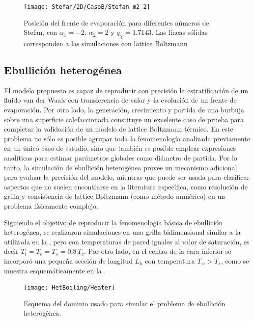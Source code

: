 \begin{figure}[ht]
	\centering
	\texttt{[image: Stefan/2D/CasoB/Stefan\_m2\_2]}
	\caption{Posici\'on del frente de evaporaci\'on para diferentes n\'umeros de Stefan, con $\alpha_1 = -2$, $\alpha_2=2$ y $q_{\chi} = 1.7143$. Las l\'ineas s\'olidas corresponden a las simulaciones con lattice Boltzmann}
	\label{fig:Stefan_m2_2}
\end{figure}










\subsection{Ebullici\'on heterog\'enea}

El modelo propuesto es capaz de reproducir con precisi\'on la estratificaci\'on de un fluido van der Waals con transferencia de calor y la evoluci\'on de un frente de evaporaci\'on. Por otro lado, la generaci\'on, crecimiento y partida de una burbuja sobre  una superficie calefaccionada constituye un excelente caso de prueba para completar la validaci\'on de un modelo de lattice Boltzmann t\'ermico. En este problema no s\'olo es posible agrupar toda la fenomenolog\'ia analizada previamente en un \'unico caso de estudio, sino que tambi\'en es posible emplear expresiones anal\'iticas para estimar par\'ametros globales como di\'ametro de partida. Por lo tanto, la simulaci\'on de ebullici\'on heterog\'enea provee un mecanismo adicional para evaluar la precisi\'on del modelo, mientras que puede ser usada para clarificar aspectos que no suelen encontrarse en la literatura espec\'ifica, como resoluci\'on de grilla y consistencia de lattice Boltzmann (como m\'etodo num\'erico) en un problema f\'isicamente complejo.

Siguiendo el objetivo de reproducir la fenomenolog\'ia b\'asica de ebullici\'on heterog\'enea, se realizaron simulaciones en una grilla bidimensional similar a la utilizada en la , pero con temperaturas de pared iguales al valor de saturaci\'on, es decir $T_t = T_b = T_s = 0.8 \, T_c$.  Por otro lado, en el centro de la cara inferior se incorpor\'o una peque\~na secci\'on de longitud $L_h$ con temperatura $T_w > T_s$, como se muestra esquem\'aticamente en la . 

\begin{figure}[ht]
	\centering
	\texttt{[image: HetBoiling/Heater]}
	\caption{Esquema del dominio usado para simular el problema de ebullici\'on heterog\'enea.}
	\label{fig:hetb_esquema}
\end{figure}

